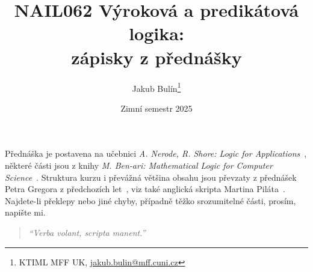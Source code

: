 \title{NAIL062 Výroková a predikátová logika: \\ zápisky z přednášky}
\author{Jakub Bulín\footnote{KTIML MFF UK, \href{mailto://jakub.bulin@mff.cuni.cz}{jakub.bulin@mff.cuni.cz}}}
\date{Zimní semestr 2025}
\maketitle

Přednáška je postavena na učebnici \emph{A. Nerode, R. Shore: Logic for Applications}~\cite{nerode_logic_2012}, některé části jsou z knihy \emph{M. Ben-ari: Mathematical Logic for Computer Science}~\cite{ben-ari_mathematical_2012}. Struktura kurzu i převážná většina obsahu jsou převzaty z přednášek Petra Gregora z předchozích let~\cite{gregor_vyrokova_nodate}, viz také anglická skripta Martina Piláta~\cite{pilat_lecture_nodate}. Najdete-li překlepy nebo jiné chyby, případně těžko srozumitelné části, prosím, napište mi.

\vfill 

\begin{quote}
    \itshape
    ``Verba volant, scripta manent.''
\end{quote}

\tableofcontents